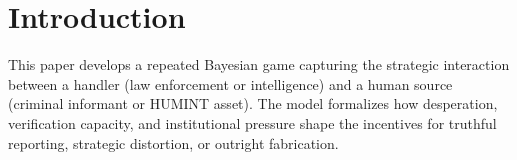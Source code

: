 \section{Introduction}

This paper develops a repeated Bayesian game capturing the strategic
interaction between a handler (law enforcement or intelligence) and a
human source (criminal informant or HUMINT asset). The model formalizes
how desperation, verification capacity, and institutional pressure shape
the incentives for truthful reporting, strategic distortion, or outright
fabrication.
